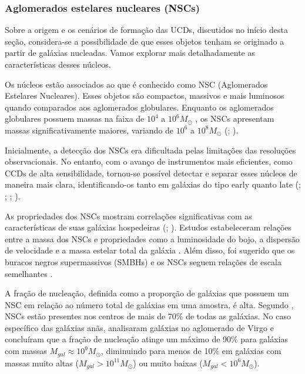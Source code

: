 \subsubsection{Aglomerados estelares nucleares (NSCs)}\label{subsubsection:NSC}
Sobre a origem e os cenários de formação das UCDs, discutidos no início desta seção, considera-se a possibilidade de que esses objetos tenham se originado a partir de galáxias nucleadas. Vamos explorar mais detalhadamente as características desses núcleos.

Os núcleos estão associados ao que é conhecido como \ac{NSC} (Aglomerados Estelares Nucleares). Esses objetos são compactos, massivos e mais luminosos quando comparados aos aglomerados globulares. Enquanto os aglomerados globulares possuem massas na faixa de $10^4$ a $10^6 M_{\odot}$ \citep{Masters_2010}, os NSCs apresentam massas significativamente maiores, variando de $10^6$ a $10^8 M_{\odot}$ (\citealp{Spengler_2017}; \citealp{Georgiev_2016}).

Inicialmente, a detecção dos NSCs era dificultada pelas limitações das resoluções observacionais. No entanto, com o avanço de instrumentos mais eficientes, como CCDs de alta sensibilidade, tornou-se possível detectar e separar esses núcleos de maneira mais clara, identificando-os tanto em galáxias do tipo early quanto late (\citealp{Phillips_1996}; \citealp{Carollo_1997}; \citealp{Matthews_1999}; \citealp{boker_2002}).

As propriedades dos NSCs mostram correlações significativas com as características de suas galáxias hospedeiras (\citealp{Balcells_2003}; \citealp{Graham_2003}). Estudos estabeleceram relações entre a massa dos NSCs e propriedades como a luminosidade do bojo, a dispersão de velocidade e a massa estelar total da galáxia \citep{Ferrarese_2006, Wehner_2006, Rossa_2006}. Além disso, foi sugerido que os buracos negros supermassivos (SMBHs) e os NSCs seguem relações de escala semelhantes \citep{Ferrarese_2006}.

A fração de nucleação, definida como a proporção de galáxias que possuem um NSC em relação ao número total de galáxias em uma amostra, é alta. Segundo \cite{Boker_2010}, NSCs estão presentes nos centros de mais de 70\% de todas as galáxias. No caso específico das galáxias anãs, \cite{Sanchez_2019} analisaram galáxias no aglomerado de Virgo e concluíram que a fração de nucleação atinge um máximo de 90\% para galáxias com massas $M_{gal} \approx 10^9 M_{\odot}$, diminuindo para menos de 10\% em galáxias com massas muito altas ($M_{gal} > 10^{11} M_{\odot}$) ou muito baixas ($M_{gal} < 10^6 M_{\odot}$).

